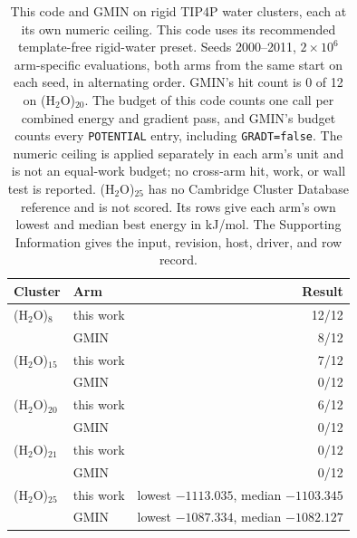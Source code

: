 \documentclass[journal=jctcce,manuscript=article]{achemso}
\begin{document}
\begin{table}
\caption{This code and GMIN on rigid TIP4P water clusters, each at its own numeric ceiling.
This code uses its recommended template-free rigid-water preset.
Seeds 2000--2011, \(2\times 10^{6}\) arm-specific evaluations, both arms from the same start on each
seed, in alternating order.
GMIN's hit count is 0 of 12 on (H\(_2\)O)\(_{20}\).
The budget of this code counts one call per combined energy and gradient pass, and GMIN's budget counts
every \texttt{POTENTIAL} entry, including \texttt{GRADT=false}.
The numeric ceiling is applied separately in each arm's unit and is not an equal-work budget;
no cross-arm hit, work, or wall test is reported.
(H\(_2\)O)\(_{25}\) has no Cambridge Cluster Database reference and is not scored.
Its rows give each arm's own lowest and median best energy in kJ/mol.
The Supporting Information gives the
input, revision,
host, driver, and row record.}
\label{tab:tip4p-gmin}
\centering
\footnotesize
\setlength{\tabcolsep}{3pt}
\begin{tabular}{@{}llr@{}}
\toprule
Cluster & Arm & Result \\
\midrule
(H\(_2\)O)\(_{8}\) & this work & 12/12 \\
 & GMIN & 8/12 \\
(H\(_2\)O)\(_{15}\) & this work & 7/12 \\
 & GMIN & 0/12 \\
(H\(_2\)O)\(_{20}\) & this work & 6/12 \\
 & GMIN & 0/12 \\
(H\(_2\)O)\(_{21}\) & this work & 0/12 \\
 & GMIN & 0/12 \\
(H\(_2\)O)\(_{25}\) & this work & lowest \(-1113.035\), median \(-1103.345\) \\
 & GMIN & lowest \(-1087.334\), median \(-1082.127\) \\
\bottomrule
\end{tabular}
\end{table}
\end{document}
